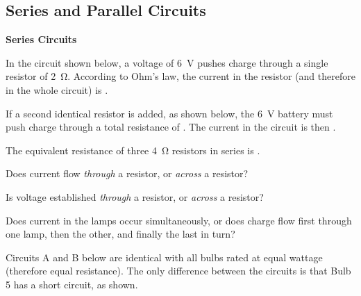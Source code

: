 \documentclass[]{exam}
\begin{document}
\clearpage


\subsection*{Series and Parallel Circuits}

\textbf{Series Circuits}

\begin{questions}
\question 
In the circuit shown below, a voltage of \SI{6}{V} pushes charge through a single resistor of \SI{2}{\ohm}. According to Ohm's law, the current in the resistor (and therefore in the whole circuit) is \fillin[\SI{3}{A}].

\begin{center}
\end{center}

\question
If a second identical resistor is added, as shown below, the \SI{6}{V} battery must push charge through a total resistance of \fillin[\SI{6}{\ohm}].
The current in the circuit is then \fillin[\SI{1}{A}].

\begin{center}
\end{center}


\question
The equivalent resistance of three \SI{4}{\ohm} resistors in series is \fillin[\SI{12}{\ohm}].

\question
Does current flow \textit{through} a resistor, or \textit{across} a resistor? \fillin[through]

Is voltage established \textit{through} a resistor, or \textit{across} a resistor? \fillin[across]


\question
Does current in the lamps occur simultaneously, or does charge flow first through one lamp, then the other, and finally the last in turn?




\question 
Circuits A and B below are identical with all bulbs rated at equal wattage (therefore equal resistance). The only difference between the circuits is that Bulb 5 has a short circuit, as shown.


\end{questions}
\end{document}
